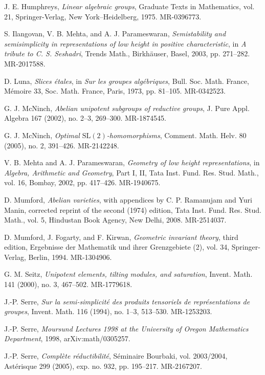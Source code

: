 \documentclass[11pt]{article}
\begin{document}
\begin{description}[leftmargin=2.7cm,labelwidth=2.2cm,style=nextline]
\item[{[H]}] J. E. Humphreys, \emph{Linear algebraic groups}, Graduate Texts in Mathematics, vol. 21, Springer-Verlag, New York--Heidelberg, 1975. MR-0396773.
\item[{[IMP]}] S. Ilangovan, V. B. Mehta, and A. J. Parameswaran, \emph{Semistability and semisimplicity in representations of low height in positive characteristic}, in \emph{A tribute to C. S. Seshadri}, Trends Math., Birkhäuser, Basel, 2003, pp. 271--282. MR-2017588.
\item[{[Lu]}] D. Luna, \emph{Slices étales}, in \emph{Sur les groupes algébriques}, Bull. Soc. Math. France, Mémoire 33, Soc. Math. France, Paris, 1973, pp. 81--105. MR-0342523.
\item[{[Mc1]}] G. J. McNinch, \emph{Abelian unipotent subgroups of reductive groups}, J. Pure Appl. Algebra 167 (2002), no. 2--3, 269--300. MR-1874545.
\item[{[Mc2]}] G. J. McNinch, \emph{Optimal \(\mathrm{SL}(2)\)-homomorphisms}, Comment. Math. Helv. 80 (2005), no. 2, 391--426. MR-2142248.
\item[{[MP]}] V. B. Mehta and A. J. Parameswaran, \emph{Geometry of low height representations}, in \emph{Algebra, Arithmetic and Geometry}, Part I, II, Tata Inst. Fund. Res. Stud. Math., vol. 16, Bombay, 2002, pp. 417--426. MR-1940675.
\item[{[AV]}] D. Mumford, \emph{Abelian varieties}, with appendices by C. P. Ramanujam and Yuri Manin, corrected reprint of the second (1974) edition, Tata Inst. Fund. Res. Stud. Math., vol. 5, Hindustan Book Agency, New Delhi, 2008. MR-2514037.
\item[{[GIT]}] D. Mumford, J. Fogarty, and F. Kirwan, \emph{Geometric invariant theory}, third edition, Ergebnisse der Mathematik und ihrer Grenzgebiete (2), vol. 34, Springer-Verlag, Berlin, 1994. MR-1304906.
\item[{[Sei]}] G. M. Seitz, \emph{Unipotent elements, tilting modules, and saturation}, Invent. Math. 141 (2000), no. 3, 467--502. MR-1779618.
\item[{[S1]}] J.-P. Serre, \emph{Sur la semi-simplicité des produits tensoriels de représentations de groupes}, Invent. Math. 116 (1994), no. 1--3, 513--530. MR-1253203.
\item[{[S2]}] J.-P. Serre, \emph{Moursund Lectures 1998 at the University of Oregon Mathematics Department}, 1998, arXiv:math/0305257.
\item[{[S3]}] J.-P. Serre, \emph{Complète réductibilité}, Séminaire Bourbaki, vol. 2003/2004, Astérisque 299 (2005), exp. no. 932, pp. 195--217. MR-2167207.

\end{description}
\end{document}
